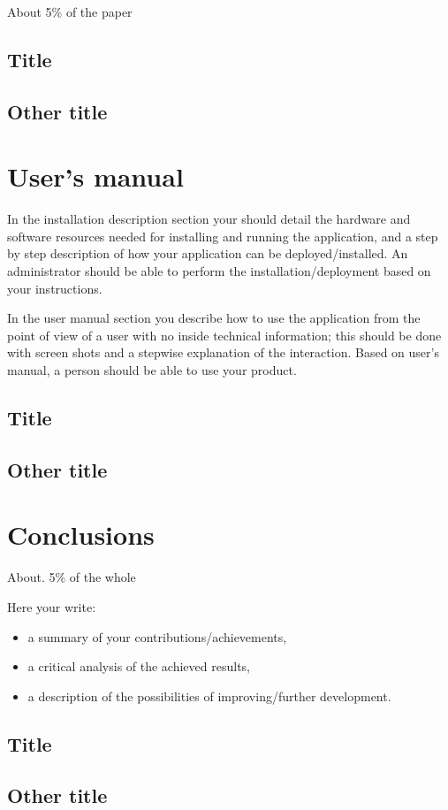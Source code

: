 \documentclass[12pt,a4paper,twoside]{report}
\begin{document}
About 5\% of the paper
\section{Title}
\section{Other title}

\chapter{User's manual}

In the installation description section your should detail the hardware and software resources needed for installing and running the application, and a step by step description of how your application can be deployed/installed. An administrator should be able to perform the installation/deployment based on your instructions.

In the user manual section you describe how to use the application from the point of view of a user with no inside technical information; this should be done with screen shots and a stepwise explanation of the interaction. Based on user's manual, a person should be able to use your product.

\section{Title}
\section{Other title}

\chapter{Conclusions}

About. 5\% of the whole

Here your write:
\begin{itemize}
\item a summary of your contributions/achievements,
\item a critical analysis of the achieved results,
\item a description of the possibilities of improving/further development.
\end{itemize}
\section{Title}
\section{Other title}


 


\end{document}
